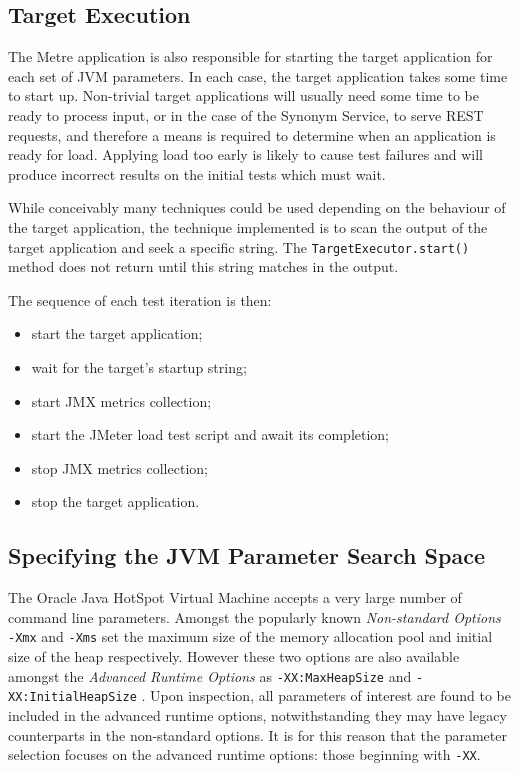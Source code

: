 \documentclass[]{final_report}
\begin{document}
\subsection{Target Execution}

The Metre application is also responsible for starting the target application for each set of JVM parameters. In each case, the target application takes some time to start up. Non-trivial target applications will usually need some time to be ready to process input, or in the case of the Synonym Service, to serve REST requests, and therefore a means is required to determine when an application is ready for load. Applying load too early is likely to cause test failures and will produce incorrect results on the initial tests which must wait.

While conceivably many techniques could be used depending on the behaviour of the target application, the technique implemented is to scan the output of the target application and seek a specific string. The \lstinline{TargetExecutor.start()}\noop{} method does not return until this string matches in the output.

The sequence of each test iteration is then:

\begin{itemize}
\item start the target application;
\item wait for the target's startup string;
\item start JMX metrics collection;
\item start the JMeter load test script and await its completion;
\item stop JMX metrics collection;
\item stop the target application.
\end{itemize}

\subsection{Specifying the JVM Parameter Search Space}

The Oracle Java HotSpot Virtual Machine accepts a very large number of command line parameters. Amongst the popularly known \textit{Non-standard Options} \lstinline{-Xmx} and \lstinline{-Xms} set the maximum size of the memory allocation pool and initial size of the heap respectively. However these two options are also available amongst the \textit{Advanced Runtime Options} as \linebreak[4] \lstinline{-XX:MaxHeapSize} and \lstinline{-XX:InitialHeapSize} \cite{java:2016}. Upon inspection, all parameters of interest are found to be included in the advanced runtime options, notwithstanding they may have legacy counterparts in the non-standard options. It is for this reason that the parameter selection focuses on the advanced runtime options: those beginning with \lstinline{-XX}.\noop{}
\end{document}
